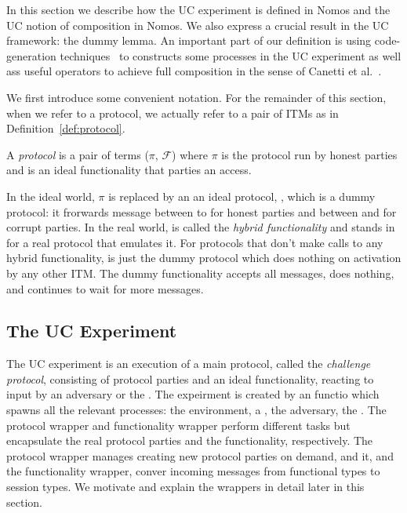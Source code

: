In this section we describe how the UC experiment is defined in Nomos and the UC notion of composition in Nomos. 
We also express a crucial result in the UC framework: the dummy lemma.
An important part of our definition is using code-generation techniques~\cite{somecodegeneration} to constructs some processes in the UC experiment as well ass useful operators to achieve full composition in the sense of Canetti et al.~\cite{uc}.

We first introduce some convenient notation.
For the remainder of this section, when we refer to a protocol, we actually refer to a pair of ITMs as in Definition~\ref{def:protocol}.
\begin{definition}\label{def:protocol}
A \textit{protocol} is a pair of terms ($\pi$, $\mathcal{F}$) where $\pi$ is the protocol run by honest parties and \F is an ideal functionality that parties an access.
\end{definition}
In the ideal world, $\pi$ is replaced by an an ideal protocol, \idealP, which is a dummy protocol: it frorwards message between \Z to \F for honest parties  and between \A and \F for corrupt parties.
In the real world, \F is called the \textit{hybrid functionality} and stands in for a real protocol that emulates it.
For protocols that don't make calls to any hybrid functionality, \F is just the dummy protocol which does nothing on activation by any other ITM.
The dummy functionality accepts all messages, does nothing, and continues to wait for more messages.

\subsection{The UC Experiment}
The UC experiment is an execution of a main protocol, called the \textit{challenge protocol}, consisting of protocol parties and an ideal functionality, reacting to input by an adversary \A or the \Z.
The expeirment is created by an  functio which spawns all the relevant processes: the environment, a , the adversary, the .
The protocol wrapper and functionality wrapper perform different tasks but encapsulate the real protocol parties and the functionality, respectively. 
The protocol wrapper manages creating new protocol parties on demand, and it, and the functionality wrapper, conver incoming messages from functional types to session types. 
We motivate and explain the wrappers in detail later in this section. 


